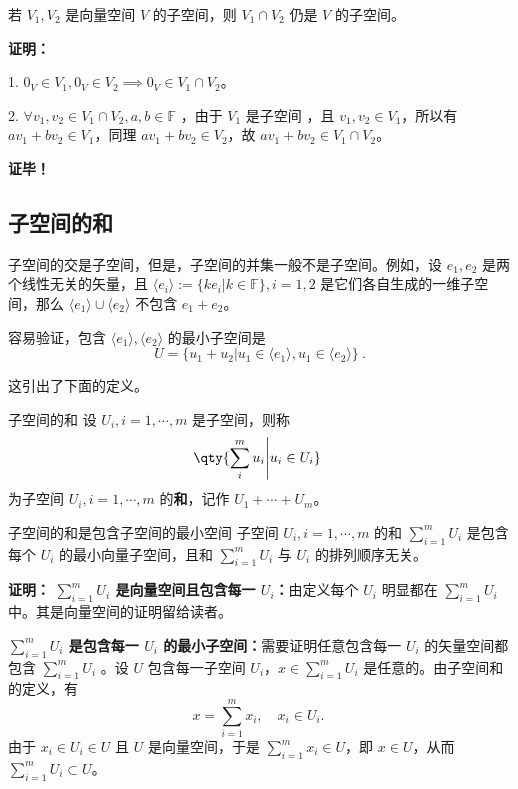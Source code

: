 \begin{theorem}{}\label{the_SubSpc_1}
若 $V_1, V_2$ 是向量空间 $V$ 的子空间，则 $V_1 \cap V_2$ 仍是 $V$ 的子空间。
\end{theorem}
\textbf{证明：}

1. $0_V \in V_1, 0_V \in V_2 \implies 0_V \in V_1 \cap V_2$。

2. $\forall v_1,v_2 \in V_1 \cap V_2, a, b \in \mathbb{F}$ ，由于 $V_1$ 是子空间 ，且 $v_1, v_2 \in V_1$，所以有 $a v_1 + b v_2 \in V_1$，同理 $a v_1 + b v_2 \in V_2$，故 $a v_1 + b v_2 \in V_1 \cap V_2$。

\textbf{证毕！}

\subsection{子空间的和}
子空间的交是子空间，但是，子空间的并集一般不是子空间。例如，设 $e_1,e_2$ 是两个线性无关的矢量，且 $\langle e_i\rangle:=\{k e_i|k\in\mathbb F\},i=1,2$ 是它们各自生成的一维子空间，那么 $\langle e_1\rangle\cup \langle e_2\rangle$ 不包含 $e_1+e_2$。

容易验证，包含 $\langle e_1\rangle,\langle e_2\rangle$ 的最小子空间是
\begin{equation}
U=\{u_1+u_2|u_1\in \langle e_1\rangle,u_1\in\langle e_2\rangle\}~.
\end{equation}

这引出了下面的定义。
\begin{definition}{子空间的和}\label{def_SubSpc_1}
设 $U_i,i=1,\cdots,m$ 是子空间，则称
\begin{equation}
\qty{\sum_{i}^m u_i\Bigg|u_i\in U_i}~
\end{equation}
为子空间 $U_i,i=1,\cdots,m$ 的\textbf{和}，记作 $ U_1+\cdots+U_m$。
\end{definition}

\begin{theorem}{子空间的和是包含子空间的最小空间}
子空间 $U_i,i=1,\cdots,m$ 的和 $\sum_{i=1}^m U_i$ 是包含每个 $U_i$ 的最小向量子空间，且和 $\sum_{i=1}^m U_i$ 与 $U_i$ 的排列顺序无关。
\end{theorem}
\textbf{证明：} \textbf{$\sum_{i=1}^m U_i$ 是向量空间且包含每一 $U_i$：}由定义每个 $U_i$ 明显都在 $\sum_{i=1}^m U_i$ 中。其是向量空间的证明留给读者。

\textbf{$\sum_{i=1}^m U_i$ 是包含每一 $U_i$ 的最小子空间：}需要证明任意包含每一 $U_i$ 的矢量空间都包含 $\sum_{i=1}^m U_i$ 。设 $U$ 包含每一子空间 $U_i$，$x\in \sum_{i=1}^m U_i$ 是任意的。由子空间和的定义，有
\begin{equation}
x=\sum_{i=1}^m x_i,\quad x_i\in U_i.~
\end{equation}
由于 $x_i\in U_i\in U$ 且 $U$ 是向量空间，于是 $\sum_{i=1}^m x_i\in U$，即 $x\in U$，从而 $\sum_{i=1}^m U_i\subset U$。

